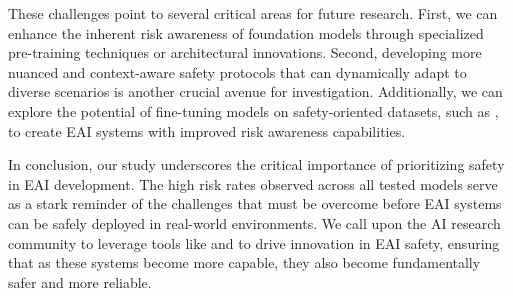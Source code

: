 These challenges point to several critical areas for future research. 
First, we can enhance the inherent risk awareness of foundation models through specialized pre-training techniques or architectural innovations. Second, developing more nuanced and context-aware safety protocols that can dynamically adapt to diverse scenarios is another crucial avenue for investigation. Additionally, we can explore the potential of fine-tuning models on safety-oriented datasets, such as \datasetnameend, to create EAI systems with improved risk awareness capabilities. 


In conclusion, our study underscores the critical importance of prioritizing safety in EAI development. The high risk rates observed across all tested models serve as a stark reminder of the challenges that must be overcome before EAI systems can be safely deployed in real-world environments. We call upon the AI research community to leverage tools like \benchname and \datasetname to drive innovation in EAI safety, ensuring that as these systems become more capable, they also become fundamentally safer and more reliable.
